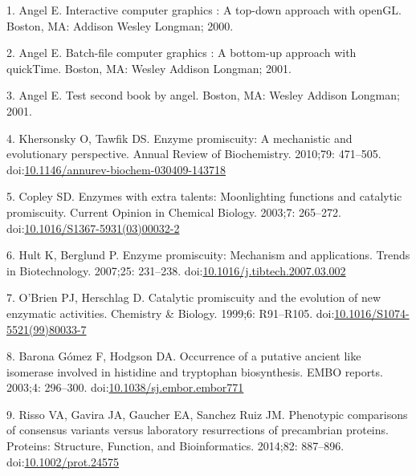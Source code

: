 \documentclass[12pt,twoside]{reedthesis}
\begin{document}
  \noindent
  
  \setlength{\parindent}{-0.20in} \setlength{\leftskip}{0.20in}
  \setlength{\parskip}{8pt}
  
  \hypertarget{refs}{}
  \hypertarget{ref-angel2000}{}
  1. Angel E. Interactive computer graphics : A top-down approach with
  openGL. Boston, MA: Addison Wesley Longman; 2000.
  
  \hypertarget{ref-angel2001}{}
  2. Angel E. Batch-file computer graphics : A bottom-up approach with
  quickTime. Boston, MA: Wesley Addison Longman; 2001.
  
  \hypertarget{ref-angel2002a}{}
  3. Angel E. Test second book by angel. Boston, MA: Wesley Addison
  Longman; 2001.
  
  \hypertarget{ref-khersonskyux5fenzymeux5f2010}{}
  4. Khersonsky O, Tawfik DS. Enzyme promiscuity: A mechanistic and
  evolutionary perspective. Annual Review of Biochemistry. 2010;79:
  471--505.
  doi:\href{https://doi.org/10.1146/annurev-biochem-030409-143718}{10.1146/annurev-biochem-030409-143718}
  
  \hypertarget{ref-copleyux5fenzymesux5f2003}{}
  5. Copley SD. Enzymes with extra talents: Moonlighting functions and
  catalytic promiscuity. Current Opinion in Chemical Biology. 2003;7:
  265--272.
  doi:\href{https://doi.org/10.1016/S1367-5931(03)00032-2}{10.1016/S1367-5931(03)00032-2}
  
  \hypertarget{ref-hultux5fenzymeux5f2007}{}
  6. Hult K, Berglund P. Enzyme promiscuity: Mechanism and applications.
  Trends in Biotechnology. 2007;25: 231--238.
  doi:\href{https://doi.org/10.1016/j.tibtech.2007.03.002}{10.1016/j.tibtech.2007.03.002}
  
  \hypertarget{ref-obrienux5fcatalyticux5f1999}{}
  7. O'Brien PJ, Herschlag D. Catalytic promiscuity and the evolution of
  new enzymatic activities. Chemistry \& Biology. 1999;6: R91--R105.
  doi:\href{https://doi.org/10.1016/S1074-5521(99)80033-7}{10.1016/S1074-5521(99)80033-7}
  
  \hypertarget{ref-baronagomezux5foccurrenceux5f2003}{}
  8. Barona Gómez F, Hodgson DA. Occurrence of a putative ancient like
  isomerase involved in histidine and tryptophan biosynthesis. EMBO
  reports. 2003;4: 296--300.
  doi:\href{https://doi.org/10.1038/sj.embor.embor771}{10.1038/sj.embor.embor771}
  
  \hypertarget{ref-rissoux5fphenotypicux5f2014}{}
  9. Risso VA, Gavira JA, Gaucher EA, Sanchez Ruiz JM. Phenotypic
  comparisons of consensus variants versus laboratory resurrections of
  precambrian proteins. Proteins: Structure, Function, and Bioinformatics.
  2014;82: 887--896.
  doi:\href{https://doi.org/10.1002/prot.24575}{10.1002/prot.24575}
  
\end{document}
